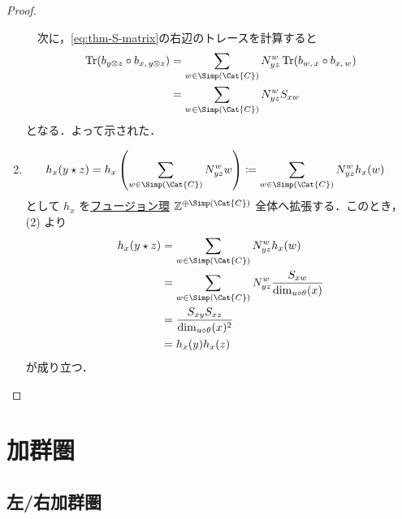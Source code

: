 \documentclass[TQFT_main]{subfiles}
\begin{document}
\begin{proof}
\begin{enumerate}
        　次に，\eqref{eq:thm-S-matrix}の右辺のトレースを計算すると
        \begin{align}
            \Tr (b_{y \otimes z} \circ b_{x,\, y \otimes z})
            &= \sum_{w \in \Simp(\Cat{C})} N^w_{yz} \Tr (b_{w,\, x} \circ b_{x,\, w}) \\
            &= \sum_{w \in \Simp(\Cat{C})} N^w_{yz} S_{xw}
        \end{align}
        となる．よって示された．
        \item 
        \begin{align}
            h_x ( y \star z )
            &= h_x \left( \sum_{w \in \Simp(\Cat{C})} N^w_{yz} w\right) \coloneqq \sum_{w \in \Simp(\Cat{C})} N^w_{yz} h_x (w) 
        \end{align}
        として $h_x$ を\hyperref[eq:fusionring]{フュージョン環} $\mathbb{Z}^{\oplus \Simp(\Cat{C})}$ 全体へ拡張する．このとき，(2) より
        \begin{align}
            h_x (y \star z)
            &= \sum_{w \in \Simp(\Cat{C})} N^w_{yz} h_x (w) \\
            &= \sum_{w \in \Simp(\Cat{C})} N^w_{yz} \frac{S_{xw}}{\dim_{u\circ\theta} (x)} \\
            &= \frac{S_{xy} S_{xz}}{\dim_{u\circ \theta} (x)^2} \\
            &= h_x (y) h_x(z)
        \end{align}
        が成り立つ．
    \end{enumerate}
    
\end{proof}

\section{加群圏}

\subsection{左/右加群圏}
\end{document}
